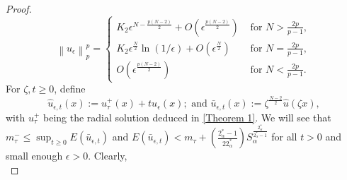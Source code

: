 \documentclass[11pt]{article}
\numberwithin{equation}{section}
\numberwithin{mytheorem}{section}
\begin{document}
\begin{proof}

			\begin{equation}\label{U_epsilon_p}
				\left\| u_{\epsilon}\right\|_p^p=\left\{
				\begin{array}{ll}
					K_2 \epsilon^{N-\frac{p(N-2)}{2}}+O(\epsilon^{\frac{p(N-2)}{2}}) & \text{ for } N>\frac{2p}{p-1},\\
					K_2\epsilon^{\frac{N}{2}}\ln(1/\epsilon)+O(\epsilon^{\frac{N}{2}}) & \text{ for } N=\frac{2p}{p-1},\\
					O(\epsilon^{\frac{p(N-2)}{2}}) & \text{ for } N<\frac{2p}{p-1}.
				\end{array}
				\right.
			\end{equation}
			For $\zeta, t\geq 0$, define 
			$$\hat{u}_{\epsilon,t}(x):=u_{\tau}^+(x)+tu_{\epsilon}(x);\text{ and }\bar{u}_{\epsilon,t}(x):=\zeta^{\frac{N-2}{2}}\hat{u}(\zeta x),$$ 
			with $u_{\tau}^+$ being the radial solution deduced in \autoref{Theorem 1}. We will see that $\displaystyle m_{\tau}^-\leq \sup_{t\geq 0}E(\bar{u}_{\epsilon,t})$ and $E(\bar{u}_{\epsilon,t})<m_{\tau}+\left(\frac{2^*_{\alpha}-1}{22^*_{\alpha}}\right)S_{\alpha}^{\frac{2^*_{\alpha}}{2^*_{\alpha}-1}}$ for all $t>0$ and small enough $\epsilon>0$.
			Clearly,
			\begin{equation}\label{4.9}

\end{equation}
\end{proof}
\end{document}

